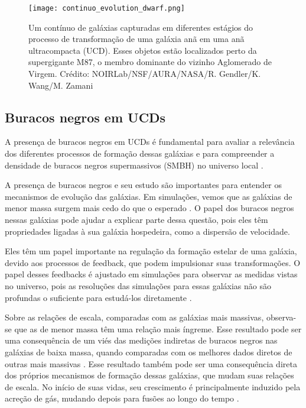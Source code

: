 \begin{figure}[!ht]
    \centering
    \texttt{[image: continuo\_evolution\_dwarf.png]} 
    \caption[]{Um contínuo de galáxias capturadas em diferentes estágios do processo de transformação de uma galáxia anã em uma anã ultracompacta (UCD). Esses objetos estão localizados perto da supergigante M87, o membro dominante do vizinho Aglomerado de Virgem. Crédito: NOIRLab/NSF/AURA/NASA/R. Gendler/K. Wang/M. Zamani}
    \label{continuo_evolution_dwarf}
\end{figure}

\subsection{Buracos negros em UCDs}\label{subsec:buracos negros}
A presença de buracos negros em UCDs é fundamental para avaliar a relevância dos diferentes processos de formação dessas galáxias e para compreender a densidade de buracos negros supermassivos (SMBH) no universo local \citep{Seth_2014}.

A presença de buracos negros e seu estudo são importantes para entender os mecanismos de evolução das galáxias. Em simulações, vemos que as galáxias de menor massa surgem mais cedo do que o esperado \citep{Weinmann_2012}. O papel dos buracos negros nessas galáxias pode ajudar a explicar parte dessa questão, pois eles têm propriedades ligadas à sua galáxia hospedeira, como a dispersão de velocidade.

Eles têm um papel importante na regulação da formação estelar de uma galáxia, devido aos processos de feedback, que podem impulsionar suas transformações. O papel desses feedbacks é ajustado em simulações para observar as medidas vistas no universo, pois as resoluções das simulações para essas galáxias não são profundas o suficiente para estudá-los diretamente \citep{Springel_2005}.

Sobre as relações de escala, comparadas com as galáxias mais massivas, observa-se que as de menor massa têm uma relação mais íngreme. Esse resultado pode ser uma consequência de um viés das medições indiretas de buracos negros nas galáxias de baixa massa, quando comparadas com os melhores dados diretos de outras mais massivas \citep{Shankar_2016}. Esse resultado também pode ser uma consequência direta dos próprios mecanismos de formação dessas galáxias, que mudam suas relações de escala. No início de suas vidas, seu crescimento é principalmente induzido pela acreção de gás, mudando depois para fusões ao longo do tempo \citep{Graham_2015}.


